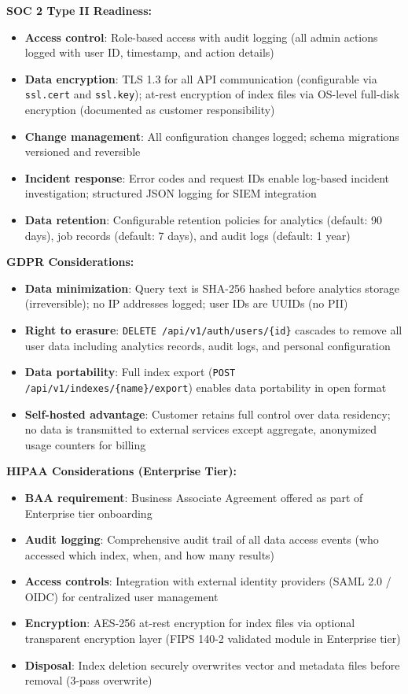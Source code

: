 \documentclass[11pt,a4paper]{article}
\newcommand{\inlinecode}[1]{\texttt{\small\colorbox{ctCodeBg}{#1}}}
\begin{document}
\begin{reqbox}
\textbf{SOC 2 Type II Readiness:}
\begin{itemize}
    \item \textbf{Access control}: Role-based access with audit logging (all admin actions logged with user ID, timestamp, and action details)
    \item \textbf{Data encryption}: TLS 1.3 for all API communication (configurable via \inlinecode{ssl.cert} and \inlinecode{ssl.key}); at-rest encryption of index files via OS-level full-disk encryption (documented as customer responsibility)
    \item \textbf{Change management}: All configuration changes logged; schema migrations versioned and reversible
    \item \textbf{Incident response}: Error codes and request IDs enable log-based incident investigation; structured JSON logging for SIEM integration
    \item \textbf{Data retention}: Configurable retention policies for analytics (default: 90 days), job records (default: 7 days), and audit logs (default: 1 year)
\end{itemize}

\textbf{GDPR Considerations:}
\begin{itemize}
    \item \textbf{Data minimization}: Query text is SHA-256 hashed before analytics storage (irreversible); no IP addresses logged; user IDs are UUIDs (no PII)
    \item \textbf{Right to erasure}: \inlinecode{DELETE /api/v1/auth/users/\{id\}} cascades to remove all user data including analytics records, audit logs, and personal configuration
    \item \textbf{Data portability}: Full index export (\inlinecode{POST /api/v1/indexes/\{name\}/export}) enables data portability in open format
    \item \textbf{Self-hosted advantage}: Customer retains full control over data residency; no data is transmitted to external services except aggregate, anonymized usage counters for billing
\end{itemize}

\textbf{HIPAA Considerations (Enterprise Tier):}
\begin{itemize}
    \item \textbf{BAA requirement}: Business Associate Agreement offered as part of Enterprise tier onboarding
    \item \textbf{Audit logging}: Comprehensive audit trail of all data access events (who accessed which index, when, and how many results)
    \item \textbf{Access controls}: Integration with external identity providers (SAML 2.0 / OIDC) for centralized user management
    \item \textbf{Encryption}: AES-256 at-rest encryption for index files via optional transparent encryption layer (FIPS 140-2 validated module in Enterprise tier)
    \item \textbf{Disposal}: Index deletion securely overwrites vector and metadata files before removal (3-pass overwrite)
\end{itemize}


\end{reqbox}
\end{document}
